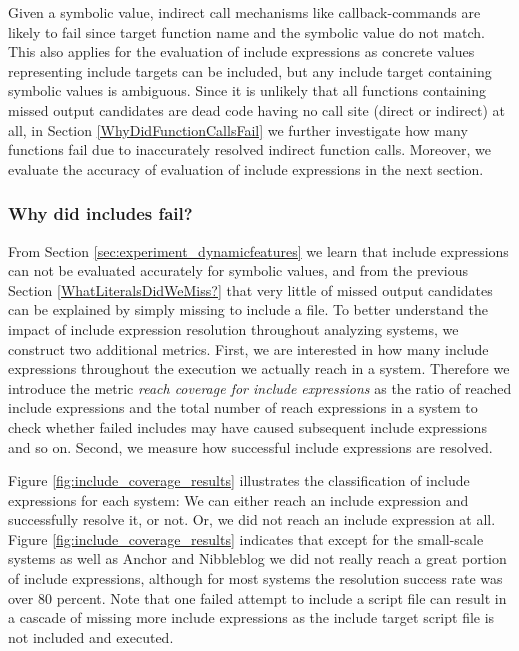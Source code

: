 \documentclass[sigconf]{acmart}
\renewcommand{\sf}[1]{\textsf{#1}}
\begin{document}
Given a symbolic value, indirect call mechanisms like callback-commands are
likely to fail since target function name and the symbolic value do not match.
This also applies for the evaluation of include expressions as concrete values
representing include targets can be included, but any include target containing
symbolic values is ambiguous. Since it is unlikely that all functions containing
missed output candidates are dead code having no call site (direct or
indirect) at all, in Section \ref{WhyDidFunctionCallsFail} we further
investigate how many functions fail due to inaccurately resolved indirect
function calls. Moreover, we evaluate the accuracy of evaluation of include
expressions in the next section.

\subsubsection{Why did includes fail?}
\label{WhyDidIncludesFail}
From Section \ref{sec:experiment_dynamicfeatures} we learn that include
expressions can not be evaluated accurately for symbolic values, and from the
previous Section \ref{WhatLiteralsDidWeMiss?} that very little of missed output
candidates can be explained by simply missing to include a file. To better
understand the impact of include expression resolution throughout analyzing
systems, we construct two additional metrics. First, we are interested in how
many include expressions throughout the execution we actually reach in a system.
Therefore we introduce the metric \emph{reach coverage for include expressions}
as the ratio of reached include expressions and the total number of reach
expressions in a system to check whether failed includes may have caused
subsequent include expressions and so on. Second, we measure how successful
include expressions are resolved. 

Figure \ref{fig:include_coverage_results} illustrates the classification of
include expressions for each system: We can either reach an include expression
and successfully resolve it, or not. Or, we did not reach an include expression at all. 
Figure \ref{fig:include_coverage_results} indicates that except for the
small-scale systems as well as \sf{Anchor} and \sf{Nibbleblog} we did not really
reach a great portion of include expressions, although for most systems the
resolution success rate was over 80 percent. Note that one failed attempt
to include a script file can result in a cascade of missing more include
expressions as the include target script file is not included and executed.
\end{document}
